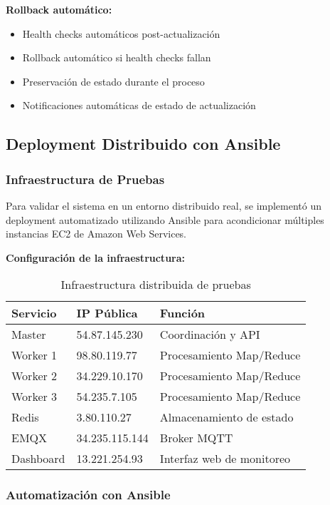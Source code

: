 \textbf{Rollback automático:}
\begin{itemize}
    \item Health checks automáticos post-actualización
    \item Rollback automático si health checks fallan
    \item Preservación de estado durante el proceso
    \item Notificaciones automáticas de estado de actualización
\end{itemize}

\subsection{Deployment Distribuido con Ansible}

\subsubsection{Infraestructura de Pruebas}

Para validar el sistema en un entorno distribuido real, se implementó un deployment automatizado utilizando Ansible para acondicionar múltiples instancias EC2 de Amazon Web Services.

\textbf{Configuración de la infraestructura:}
\begin{table}[H]
\centering
\begin{tabular}{|l|l|l|}
\hline
\textbf{Servicio} & \textbf{IP Pública} & \textbf{Función} \\
\hline
Master & 54.87.145.230 & Coordinación y API \\
Worker 1 & 98.80.119.77 & Procesamiento Map/Reduce \\
Worker 2 & 34.229.10.170 & Procesamiento Map/Reduce \\
Worker 3 & 54.235.7.105 & Procesamiento Map/Reduce \\
Redis & 3.80.110.27 & Almacenamiento de estado \\
EMQX & 34.235.115.144 & Broker MQTT \\
Dashboard & 13.221.254.93 & Interfaz web de monitoreo \\
\hline
\end{tabular}
\caption{Infraestructura distribuida de pruebas}
\label{table:distributed-infrastructure}
\end{table}

\subsubsection{Automatización con Ansible}

